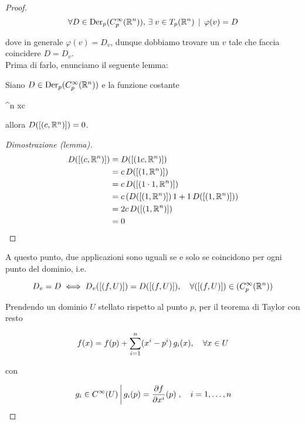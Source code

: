 \begin{proof}
	\begin{equation}
		\forall D \in \operatorname{Der}_{p} (C_{p}^{\infty}(\mathbb{R}^{n})), \, \exists \; v \in T_{p}(\mathbb{R}^{n}) \, \mid \, \varphi(v) = D
	\end{equation}
	
	dove in generale $ \varphi(v) = D_{v} $, dunque dobbiamo trovare un $ v $ tale che faccia coincidere $ D = D_{v} $. \\
	Prima di farlo, enunciamo il seguente lemma:

	\begin{lemma}
		Siano $ D \in \operatorname{Der}_{p} (C_{p}^{\infty}(\mathbb{R}^{n})) $ e la funzione costante
		
			{\R^{n}}{\R}
			{x}{c}
	
		allora $ D([(c,\mathbb{R}^{n})]) = 0 $.
	\end{lemma}

	\begin{proof}[Dimostrazione (lemma)]
		\begin{align}
			\begin{split}
				D([(c,\mathbb{R}^{n})]) &= D([(1 c,\mathbb{R}^{n})]) \\
				&= c \, D([(1,\mathbb{R}^{n})]) \\
				&= c \, D([(1 \cdot 1,\mathbb{R}^{n})]) \\
				&= c \, ( D([(1,\mathbb{R}^{n})]) \, 1 + 1 \, D([(1,\mathbb{R}^{n})]) ) \\
				&= 2 c \, D([(1,\mathbb{R}^{n})]) \\
				&= 0
			\end{split}
		\end{align}
	\end{proof}

	A questo punto, due applicazioni sono uguali se e solo se coincidono per ogni punto del dominio, i.e.
	
	\begin{equation}
		D_{v} = D \iff D_{v}([(f,U)]) = D([(f,U)]) \qcomma \forall ([(f,U)]) \in (C_{p}^{\infty}(\R^{n}))
	\end{equation}

	Prendendo un dominio $ U $ stellato rispetto al punto $ p $, per il teorema di Taylor con resto
	
	\begin{equation}
		f(x) = f(p) + \sum_{i=1}^{n} (x^{i}-p^{i}) \, g_{i}(x) \qcomma \forall x \in U
	\end{equation}

	con
	
	\begin{equation}
		\left. g_{i} \in C^{\infty}(U) \st g_{i}(p) = \dfrac{\partial f}{\partial x^{i}} (p) \right. \qcomma i=1,\dots,n
	\end{equation}


\end{proof}
